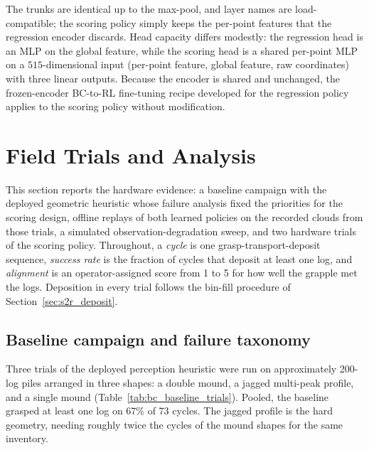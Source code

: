 The trunks are identical up to the max-pool, and layer names are
load-compatible; the scoring policy simply keeps the per-point features that
the regression encoder discards. Head capacity differs modestly: the
regression head is an MLP on the global feature, while the scoring head is a
shared per-point MLP on a $515$-dimensional input (per-point feature, global
feature, raw coordinates) with three linear outputs. Because the encoder is
shared and unchanged, the frozen-encoder BC-to-RL fine-tuning recipe
developed for the regression policy applies to the scoring policy without
modification.

\section{Field Trials and Analysis}
\label{sec:bc_trials}

This section reports the hardware evidence: a baseline campaign with the
deployed geometric heuristic whose failure analysis fixed the priorities for
the scoring design, offline replays of both learned policies on the recorded
clouds from those trials, a simulated observation-degradation sweep, and two
hardware trials of the scoring policy. Throughout, a \emph{cycle} is one
grasp-transport-deposit sequence, \emph{success rate} is the fraction of
cycles that deposit at least one log, and \emph{alignment} is an
operator-assigned score from 1 to 5 for how well the grapple met the logs.
Deposition in every trial follows the bin-fill procedure of
Section~\ref{sec:s2r_deposit}.

\subsection{Baseline campaign and failure taxonomy}
\label{sec:bc_baseline_trials}

Three trials of the deployed perception heuristic were run on approximately
200-log piles arranged in three shapes: a double mound, a jagged multi-peak
profile, and a single mound (Table~\ref{tab:bc_baseline_trials}). Pooled, the
baseline grasped at least one log on 67\% of 73 cycles. The jagged profile is
the hard geometry, needing roughly twice the cycles of the mound shapes for
the same inventory.

